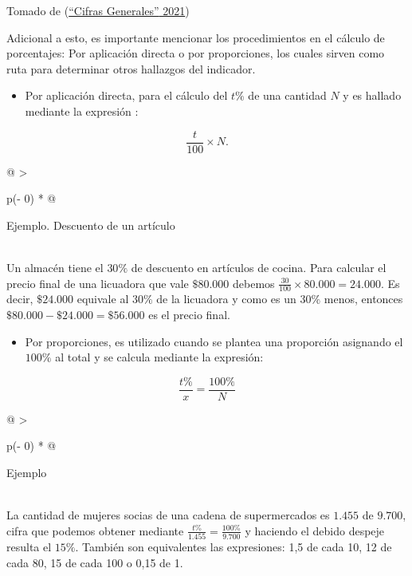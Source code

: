 \documentclass[
  11pt,
]{book}
\providecommand{\tightlist}{%
  \setlength{\itemsep}{0pt}\setlength{\parskip}{0pt}}
\begin{document}
Tomado de (\protect\hyperlink{ref-BibEntry244021Mar}{{``Cifras Generales''} 2021})

Adicional a esto, es importante mencionar los procedimientos en el cálculo de porcentajes: Por aplicación directa o por proporciones, los cuales sirven como ruta para determinar otros hallazgos del indicador.

\begin{itemize}
\tightlist
\item
  Por aplicación directa, para el cálculo del \(t\%\) de una cantidad \(N\) y es hallado mediante la expresión :
\end{itemize}

\[\begin{equation}
\frac{t}{100}\times N.
\end{equation}\]

\begin{longtable}[]{@{}
  >{\raggedright\arraybackslash}p{(\columnwidth - 0\tabcolsep) * }@{}}
\toprule
\begin{minipage}[b]{\linewidth}\raggedright
Ejemplo. Descuento de un artículo
\end{minipage} \\
\midrule
\endhead
Un almacén tiene el \(30\%\) de descuento en artículos de cocina. Para calcular el precio final de una licuadora que vale \(\$80.000\) debemos \(\frac{30}{100}\times 80.000=24.000.\) Es decir, \(\$24.000\) equivale al \(30\%\) de la licuadora y como es un \(30\%\) menos, entonces \(\$80.000-\$24.000=\$56.000\) es el precio final. \\
\bottomrule
\end{longtable}

\begin{itemize}
\tightlist
\item
  Por proporciones, es utilizado cuando se plantea una proporción asignando el \(100\%\) al total y se calcula mediante la expresión:
\end{itemize}

\[\begin{equation}
\frac{t\%}{x}=\frac{100\%}{N}
\end{equation}\]

\begin{longtable}[]{@{}
  >{\raggedright\arraybackslash}p{(\columnwidth - 0\tabcolsep) * }@{}}
\toprule
\begin{minipage}[b]{\linewidth}\raggedright
Ejemplo
\end{minipage} \\
\midrule
\endhead
La cantidad de mujeres socias de una cadena de supermercados es \(1.455\) de \(9.700\), cifra que podemos obtener mediante \(\frac{t\%}{1.455}=\frac{100\%}{9.700}\) y haciendo el debido despeje resulta el \(15\%\). También son equivalentes las expresiones: 1,5 de cada 10, 12 de cada 80, 15 de cada 100 o 0,15 de 1. \\
\bottomrule
\end{longtable}
\end{document}
